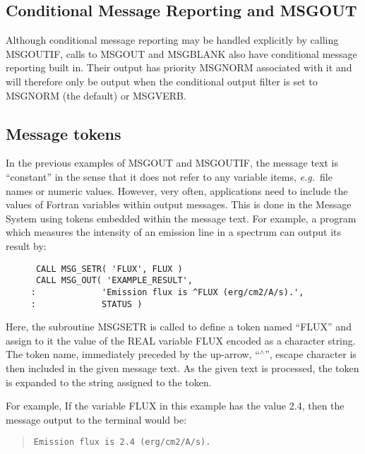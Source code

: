\documentclass[twoside,11pt]{article}
\newcommand{\xlabel}[1]{}
\renewcommand{\_}{\texttt{\symbol{95}}}
\begin{document}
\subsection{\xlabel{conditional_message_reporting_and_msg_out}Conditional Message Reporting and MSG\_OUT}

Although conditional message reporting may be handled explicitly by calling
MSG\_OUTIF, calls to MSG\_OUT and MSG\_BLANK also have conditional message
reporting built in.
Their output has priority MSG\_\_NORM associated with it and will therefore
only be output when the conditional output filter is set to MSG\_\_NORM (the 
default) or MSG\_\_VERB.

\subsection{\xlabel{message_tokens}Message tokens}
In the previous examples of MSG\_OUT and MSG\_OUTIF, the message text is 
``constant'' in the sense that it does not refer to any variable items, 
\textit{e.g.}\ file names or numeric values. 
However, very often, applications need to include the values of Fortran 
variables within output messages. 
This is done in the Message System using tokens embedded within the message
text.
For example, a program which measures the intensity of an emission line in
a spectrum can output its result by:

\begin {small}
\begin{verbatim}
      CALL MSG_SETR( 'FLUX', FLUX )
      CALL MSG_OUT( 'EXAMPLE_RESULT', 
     :             'Emission flux is ^FLUX (erg/cm2/A/s).',
     :             STATUS )
\end{verbatim}
\end {small}

Here, the subroutine MSG\_SETR is called to define a token named ``FLUX''
and assign to it the value of the REAL variable FLUX encoded as a character 
string.
The token name, immediately preceded by the up-arrow, ``$^\wedge$'', escape 
character is then included in the given message text. 
As the given text is processed, the token is expanded to the string assigned to
the token.

For example, If the variable FLUX in this example has the value 2.4, then
the message output to the terminal would be:

\begin {quote}
\begin {small}
\begin{verbatim}
Emission flux is 2.4 (erg/cm2/A/s).
\end{verbatim}
\end {small}
\end {quote}
\end{document}
